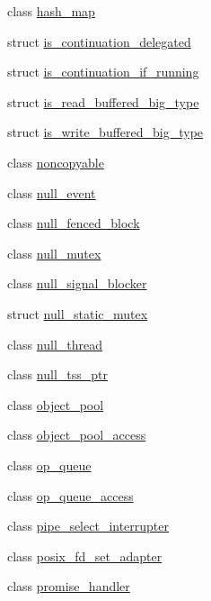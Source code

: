 \begin{DoxyCompactItemize}
class \hyperlink{classasio_1_1detail_1_1hash__map}{hash\+\_\+map}
\item 
struct \hyperlink{structasio_1_1detail_1_1is__continuation__delegated}{is\+\_\+continuation\+\_\+delegated}
\item 
struct \hyperlink{structasio_1_1detail_1_1is__continuation__if__running}{is\+\_\+continuation\+\_\+if\+\_\+running}
\item 
struct \hyperlink{structasio_1_1detail_1_1is__read__buffered__big__type}{is\+\_\+read\+\_\+buffered\+\_\+big\+\_\+type}
\item 
struct \hyperlink{structasio_1_1detail_1_1is__write__buffered__big__type}{is\+\_\+write\+\_\+buffered\+\_\+big\+\_\+type}
\item 
class \hyperlink{classasio_1_1detail_1_1noncopyable}{noncopyable}
\item 
class \hyperlink{classasio_1_1detail_1_1null__event}{null\+\_\+event}
\item 
class \hyperlink{classasio_1_1detail_1_1null__fenced__block}{null\+\_\+fenced\+\_\+block}
\item 
class \hyperlink{classasio_1_1detail_1_1null__mutex}{null\+\_\+mutex}
\item 
class \hyperlink{classasio_1_1detail_1_1null__signal__blocker}{null\+\_\+signal\+\_\+blocker}
\item 
struct \hyperlink{structasio_1_1detail_1_1null__static__mutex}{null\+\_\+static\+\_\+mutex}
\item 
class \hyperlink{classasio_1_1detail_1_1null__thread}{null\+\_\+thread}
\item 
class \hyperlink{classasio_1_1detail_1_1null__tss__ptr}{null\+\_\+tss\+\_\+ptr}
\item 
class \hyperlink{classasio_1_1detail_1_1object__pool}{object\+\_\+pool}
\item 
class \hyperlink{classasio_1_1detail_1_1object__pool__access}{object\+\_\+pool\+\_\+access}
\item 
class \hyperlink{classasio_1_1detail_1_1op__queue}{op\+\_\+queue}
\item 
class \hyperlink{classasio_1_1detail_1_1op__queue__access}{op\+\_\+queue\+\_\+access}
\item 
class \hyperlink{classasio_1_1detail_1_1pipe__select__interrupter}{pipe\+\_\+select\+\_\+interrupter}
\item 
class \hyperlink{classasio_1_1detail_1_1posix__fd__set__adapter}{posix\+\_\+fd\+\_\+set\+\_\+adapter}
\item 
class \hyperlink{classasio_1_1detail_1_1promise__handler}{promise\+\_\+handler}

\end{DoxyCompactItemize}
